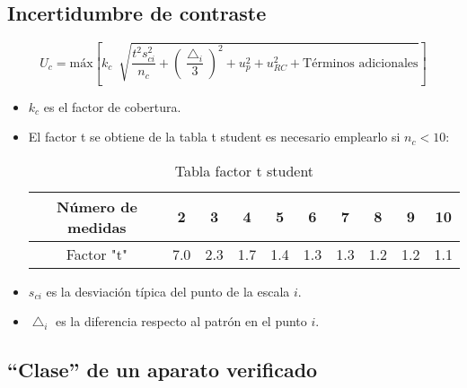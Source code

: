 \subsection{Incertidumbre de contraste}
\[U_c = \text{máx} \left[{k_c \ \sqrt[]{\frac{t^2 s_{ci}^2}{n_c}+\left({\frac{\bigtriangleup_i}{3}}\right)^2+u_p^2+u_{RC}^2+\text{Términos adicionales}}}\right]\]

\begin{itemize}
\item $k_c$ es el factor de cobertura.

	\item El factor t se obtiene de la tabla t student es necesario emplearlo si $n_c < 10$:
\renewcommand{\arraystretch}{1.1} %
\begin{table}[H]
	\centering
	\begin{tabular}{|c|c|c|c|c|c|c|c|c|c|}
		\hline
		\textbf{Número de medidas} & \textbf{2} & \textbf{3} & \textbf{4} & \textbf{5} & \textbf{6} & \textbf{7}
		& \textbf{8} & \textbf{9} & \textbf{10} \\
		\hline
		Factor "t"& 7.0 & 2.3 & 1.7 & 1.4 & 1.3 & 1.3 & 1.2
		& 1.2 & 1.1  \\
		\hline 
	\end{tabular}
	\caption{Tabla factor t student}
	\label{tab:example}
\end{table}

\item $s_{ci}$ es la desviación típica del punto de la escala $i$.
\item $\bigtriangleup_i$ es la diferencia respecto al patrón en el punto $i$.

\end{itemize}



\subsection{“Clase” de un aparato verificado}




